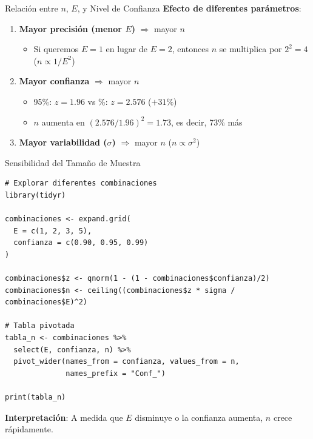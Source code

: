 \documentclass[aspectratio=169, 11pt]{beamer}
\begin{document}
\begin{frame}{Relación entre $n$, $E$, y Nivel de Confianza}
\textbf{Efecto de diferentes parámetros}:

\vspace{0.2cm}
\begin{enumerate}
  \item \textbf{Mayor precisión (menor $E$)} $\Rightarrow$ mayor $n$
  \begin{itemize}
    \item Si queremos $E = 1$ en lugar de $E = 2$, entonces $n$ se multiplica por $2^2 = 4$ \quad ($n \propto 1/E^2$)
  \end{itemize}

  \item \textbf{Mayor confianza} $\Rightarrow$ mayor $n$
  \begin{itemize}
    \item 95\%: $z = 1.96$ \quad vs \%: $z = 2.576$ ($+31\%$)
    \item $n$ aumenta en $(2.576/1.96)^2 = 1.73$, es decir, 73\% más
  \end{itemize}

  \item \textbf{Mayor variabilidad ($\sigma$)} $\Rightarrow$ mayor $n$ \quad ($n \propto \sigma^2$)
\end{enumerate}
\end{frame}

\begin{frame}[fragile]{Sensibilidad del Tamaño de Muestra}
\begin{lstlisting}[basicstyle=\ttfamily\scriptsize]
# Explorar diferentes combinaciones
library(tidyr)

combinaciones <- expand.grid(
  E = c(1, 2, 3, 5),
  confianza = c(0.90, 0.95, 0.99)
)

combinaciones$z <- qnorm(1 - (1 - combinaciones$confianza)/2)
combinaciones$n <- ceiling((combinaciones$z * sigma / combinaciones$E)^2)

# Tabla pivotada
tabla_n <- combinaciones %>%
  select(E, confianza, n) %>%
  pivot_wider(names_from = confianza, values_from = n,
              names_prefix = "Conf_")

print(tabla_n)
\end{lstlisting}

\vspace{0.3cm}
\small
\textbf{Interpretación}: A medida que $E$ disminuye o la confianza aumenta, $n$ crece rápidamente.
\end{frame}
\end{document}
